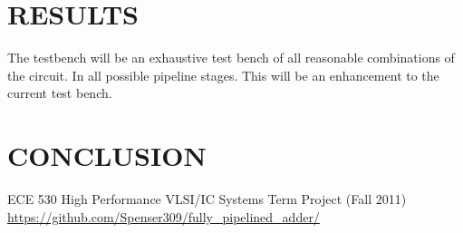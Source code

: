 \documentclass[10pt,letterpaper]{article}
\begin{document}
\section{RESULTS}

The testbench will be an exhaustive test bench of all reasonable combinations of the circuit.  In all possible pipeline stages.  This will be an enhancement to the current test bench.

\section{CONCLUSION}


\begin{thebibliography}{9}

 ECE 530 High Performance VLSI/IC Systems Term Project (Fall 2011)
 \url{https://github.com/Spenser309/fully_pipelined_adder/}

\end{thebibliography}
\end{document}

